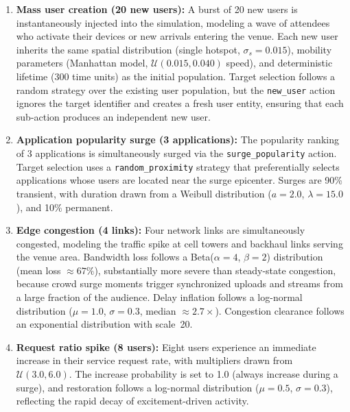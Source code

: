 \begin{enumerate}
    \item \textbf{Mass user creation (20 new users):} A burst of 20 new users is instantaneously injected into the simulation, modeling a wave of attendees who activate their devices or new arrivals entering the venue. Each new user inherits the same spatial distribution (single hotspot, $\sigma_s = 0.015$), mobility parameters (Manhattan model, $\mathcal{U}(0.015, 0.040)$ speed), and deterministic lifetime (300 time units) as the initial population. Target selection follows a random strategy over the existing user population, but the \texttt{new\_user} action ignores the target identifier and creates a fresh user entity, ensuring that each sub-action produces an independent new user.
    
    \item \textbf{Application popularity surge (3 applications):} The popularity ranking of 3 applications is simultaneously surged via the \texttt{surge\_popularity} action. Target selection uses a \texttt{random\_proximity} strategy that preferentially selects applications whose users are located near the surge epicenter. Surges are 90\% transient, with duration drawn from a Weibull distribution ($a = 2.0$, $\lambda = 15.0$), and 10\% permanent.
    
    \item \textbf{Edge congestion (4 links):} Four network links are simultaneously congested, modeling the traffic spike at cell towers and backhaul links serving the venue area. Bandwidth loss follows a Beta($\alpha = 4$, $\beta = 2$) distribution (mean loss $\approx 67\%$), substantially more severe than steady-state congestion, because crowd surge moments trigger synchronized uploads and streams from a large fraction of the audience. Delay inflation follows a log-normal distribution ($\mu = 1.0$, $\sigma = 0.3$, median $\approx 2.7\times$). Congestion clearance follows an exponential distribution with scale~20.
    
    \item \textbf{Request ratio spike (8 users):} Eight users experience an immediate increase in their service request rate, with multipliers drawn from $\mathcal{U}(3.0, 6.0)$. The increase probability is set to 1.0 (always increase during a surge), and restoration follows a log-normal distribution ($\mu = 0.5$, $\sigma = 0.3$), reflecting the rapid decay of excitement-driven activity.
\end{enumerate}

